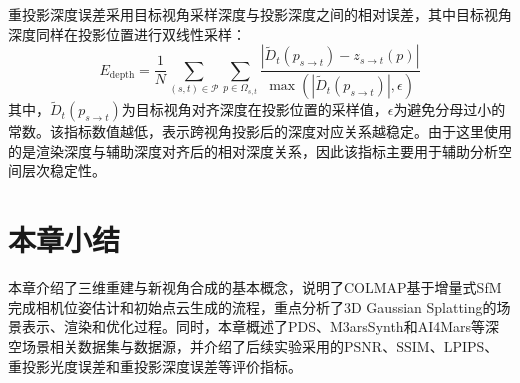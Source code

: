 重投影深度误差采用目标视角采样深度与投影深度之间的相对误差，其中目标视角深度同样在投影位置进行双线性采样：
\begin{equation}
    E_{\mathrm{depth}}=\frac{1}{N}\sum_{(s,t)\in\mathcal{P}}\sum_{p\in\Omega_{s,t}}
    \frac{\left|\tilde D_t(p_{s\rightarrow t})-z_{s\rightarrow t}(p)\right|}{\max\left(\left|\tilde D_t(p_{s\rightarrow t})\right|,\epsilon\right)}
\end{equation}
其中，$\tilde D_t(p_{s\rightarrow t})$为目标视角对齐深度在投影位置的采样值，$\epsilon$为避免分母过小的常数。该指标数值越低，表示跨视角投影后的深度对应关系越稳定。由于这里使用的是渲染深度与辅助深度对齐后的相对深度关系，因此该指标主要用于辅助分析空间层次稳定性。

\section{本章小结}
本章介绍了三维重建与新视角合成的基本概念，说明了COLMAP基于增量式SfM完成相机位姿估计和初始点云生成的流程，重点分析了3D Gaussian Splatting的场景表示、渲染和优化过程。同时，本章概述了PDS、M3arsSynth和AI4Mars等深空场景相关数据集与数据源，并介绍了后续实验采用的$\mathrm{PSNR}$、$\mathrm{SSIM}$、$\mathrm{LPIPS}$、重投影光度误差和重投影深度误差等评价指标。
